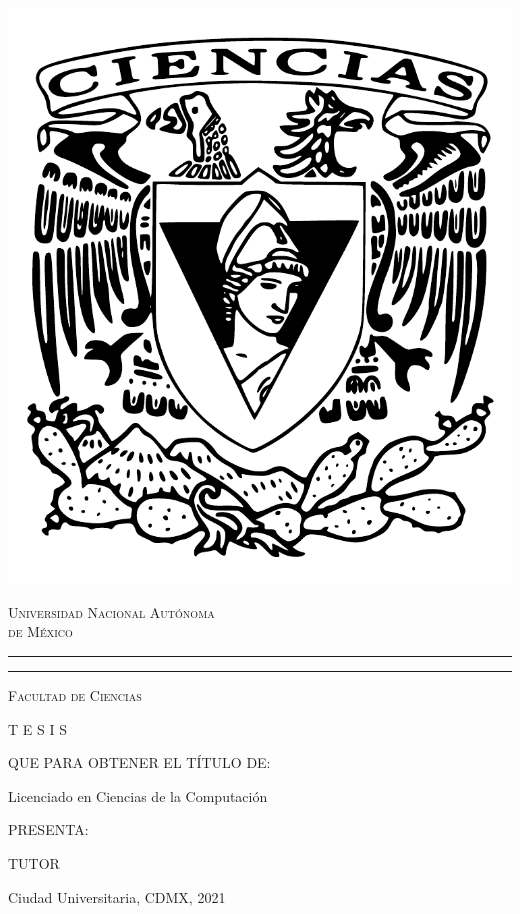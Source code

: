 \begin{minipage}[][\textheight][c]{0.3\textwidth}
  \vfill
  \includegraphics[height=0.2\textheight]{assets/ciencias.pdf}
\end{minipage}\hfill
\begin{minipage}[][\textheight][s]{0.7\textwidth}
    \centering

    \vfill
    \textsc{\Large Universidad Nacional Autónoma}\\[10pt]
    \textsc{\Large de México}
    \rule{\textwidth}{2pt}
    \vspace{5pt}
    \rule{\textwidth}{.5pt}

    \bigskip
    \textsc{\Large Facultad de Ciencias}

    \vfill
    \large{\thesisTitle}

    \vfill
    \huge{T \hspace{1cm} E \hspace{1cm} S \hspace{1cm} I \hspace{1cm} S}

    \vfill
    \large{QUE PARA OBTENER EL TÍTULO DE:}

    \medskip
    \large{Licenciado en Ciencias de la Computación}

    \vfill
    \large{PRESENTA:}

    \smallskip
    \large{\thesisName}

    \vfill
    \large{ TUTOR  }

    \smallskip
    \large{\thesisTutor}

    \vfill
    \hfill{Ciudad Universitaria, CDMX, 2021}
\end{minipage}

